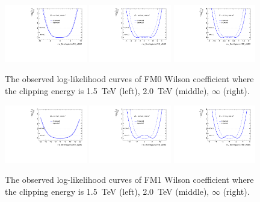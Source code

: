 \begin{figure}[ht]
    \centering
    \includegraphics[width=0.32\textwidth]{figures/aQGC/profileFM01500}
    	\includegraphics[width=0.32\textwidth]{figures/aQGC/profileFM02000}
        \includegraphics[width=0.32\textwidth]{figures/aQGC/profileFM0inf}
        \caption{The observed log-likelihood curves of FM0 Wilson coefficient where the clipping energy is 1.5~TeV (left), 2.0~TeV (middle), $\infty$ (right).}
        \label{fig:ProfileLL}
\end{figure}
\begin{figure}[ht]
    \centering
    \includegraphics[width=0.32\textwidth]{figures/aQGC/profileFM11500}
    	\includegraphics[width=0.32\textwidth]{figures/aQGC/profileFM12000}
        \includegraphics[width=0.32\textwidth]{figures/aQGC/profileFM1inf}
        \caption{The observed log-likelihood curves of FM1 Wilson coefficient where the clipping energy is 1.5~TeV (left), 2.0~TeV (middle), $\infty$ (right).}
        \label{fig:ProfileLL}
\end{figure}
